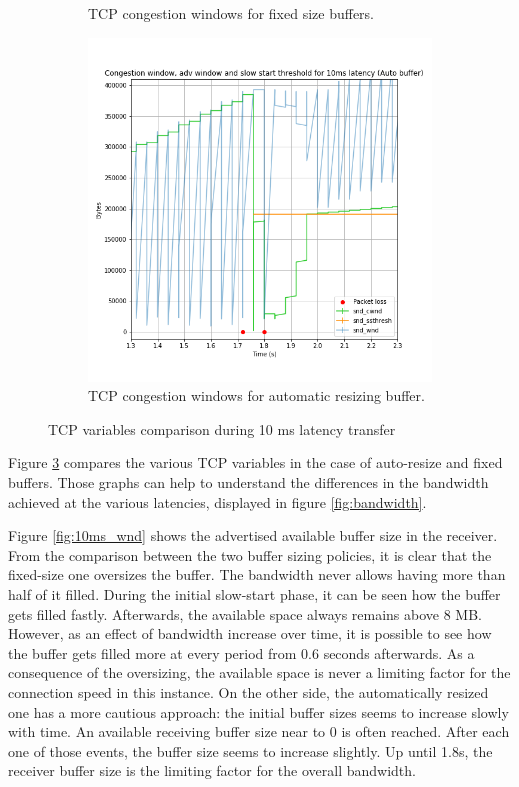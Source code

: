 \documentclass[a4paper,10pt]{article}
\begin{document}
\begin{figure}[]
\begin{subfigure}{0.5\textwidth}
   \caption{TCP congestion windows for fixed size buffers.}
    \label{fig:10ms_fixed}
\end{subfigure}
\qquad
\begin{subfigure}{0.5\textwidth}
   \centering
   \includegraphics[width=\textwidth]{images/10_detail_windows_auto.png}
    \caption{TCP congestion windows for automatic resizing buffer.}
    \label{fig:10ms_auto}
\end{subfigure}

\caption[short]{TCP variables comparison during 10 ms latency transfer}
\label{fig:tcp_variables}
\end{figure}

Figure \ref{fig:tcp_variables} compares the various TCP variables in the case of auto-resize and fixed buffers. Those graphs can help to understand the differences in the bandwidth achieved at the various latencies, displayed in figure \ref{fig:bandwidth}. 

Figure \ref{fig:10ms_wnd} shows the advertised available buffer size in the receiver. From the comparison between the two buffer sizing policies, it is clear that the fixed-size one oversizes the buffer. The bandwidth never allows having more than half of it filled. During the initial slow-start phase, it can be seen how the buffer gets filled fastly. Afterwards, the available space always remains above 8 MB. However, as an effect of bandwidth increase over time, it is possible to see how the buffer gets filled more at every period from 0.6 seconds afterwards. As a consequence of the oversizing, the available space is never a limiting factor for the connection speed in this instance. 
On the other side, the automatically resized one has a more cautious approach: the initial buffer sizes seems to increase slowly with time. An available receiving buffer size near to 0 is often reached. After each one of those events, the buffer size seems to increase slightly. Up until 1.8s, the receiver buffer size is the limiting factor for the overall bandwidth. 
\end{document}
